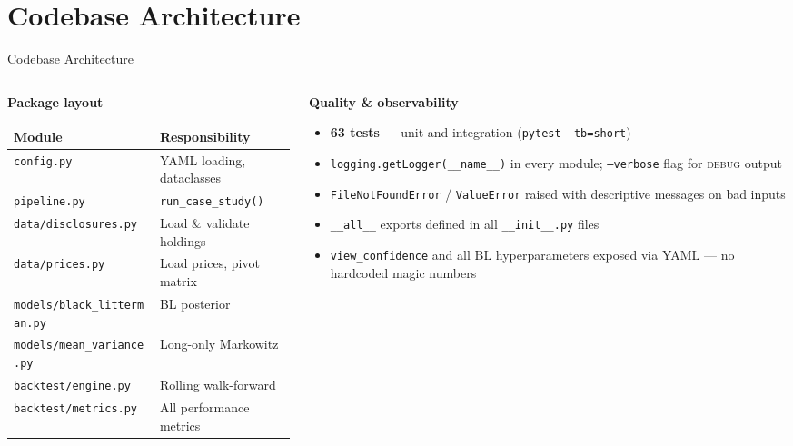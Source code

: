 \documentclass[aspectratio=169, 10pt]{beamer}
\begin{document}
\section{Codebase Architecture}

\begin{frame}[fragile]{Codebase Architecture}

  \begin{columns}[T]
    \begin{column}{0.44\textwidth}
      \textbf{Package layout}
      \medskip
      \begin{tabular}{@{}L{3.8cm} L{3.6cm}@{}}
        \toprule
        Module & Responsibility \\
        \midrule
        \texttt{config.py}            & YAML loading, dataclasses \\
        \texttt{pipeline.py}          & \texttt{run\_case\_study()} \\
        \texttt{data/disclosures.py}  & Load \& validate holdings \\
        \texttt{data/prices.py}       & Load prices, pivot matrix \\
        \texttt{models/black\_litterman.py} & BL posterior \\
        \texttt{models/mean\_variance.py}   & Long-only Markowitz \\
        \texttt{backtest/engine.py}   & Rolling walk-forward \\
        \texttt{backtest/metrics.py}  & All performance metrics \\
        \bottomrule
      \end{tabular}
    \end{column}

    \begin{column}{0.52\textwidth}
      \textbf{Quality \& observability}
      \begin{itemize}
        \item \textbf{63 tests} — unit and integration
              (\texttt{pytest --tb=short})
        \item \texttt{logging.getLogger(\_\_name\_\_)} in every module;
              \texttt{--verbose} flag for \textsc{debug} output
        \item \texttt{FileNotFoundError} / \texttt{ValueError} raised
              with descriptive messages on bad inputs
        \item \texttt{\_\_all\_\_} exports defined in all
              \texttt{\_\_init\_\_.py} files
        \item \texttt{view\_confidence} and all BL hyperparameters
              exposed via YAML — no hardcoded magic numbers
      \end{itemize}


\end{column}
\end{columns}
\end{frame}
\end{document}

